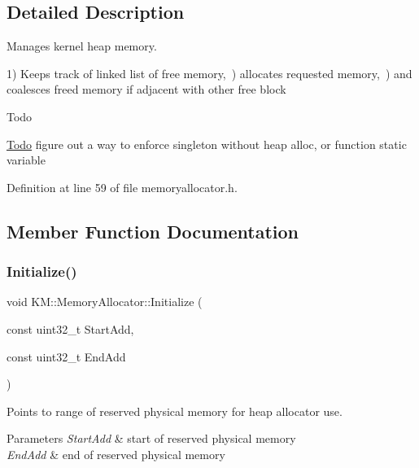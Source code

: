 \subsection{Detailed Description}
Manages kernel heap memory. 

1) Keeps track of linked list of free memory,~) allocates requested memory,~) and coalesces freed memory if adjacent with other free block \begin{DoxyRefDesc}{Todo}
\item[\hyperlink{todo__todo000001}{Todo}]figure out a way to enforce singleton without heap alloc, or function static variable \end{DoxyRefDesc}


Definition at line 59 of file memoryallocator.\+h.



\subsection{Member Function Documentation}
\mbox{\label{class_k_m_1_1_memory_allocator_acf0f1026d4b06044f1e4f21735ce6e5a}} 
\subsubsection{\texorpdfstring{Initialize()}{Initialize()}}
{\footnotesize\ttfamily void K\+M\+::\+Memory\+Allocator\+::\+Initialize (\begin{DoxyParamCaption}\item[{const uint32\+\_\+t}]{Start\+Add,  }\item[{const uint32\+\_\+t}]{End\+Add }\end{DoxyParamCaption})}



Points to range of reserved physical memory for heap allocator use. 


\begin{DoxyParams}{Parameters}
{\em Start\+Add} & start of reserved physical memory \\
\hline
{\em End\+Add} & end of reserved physical memory \\
\hline
\end{DoxyParams}


